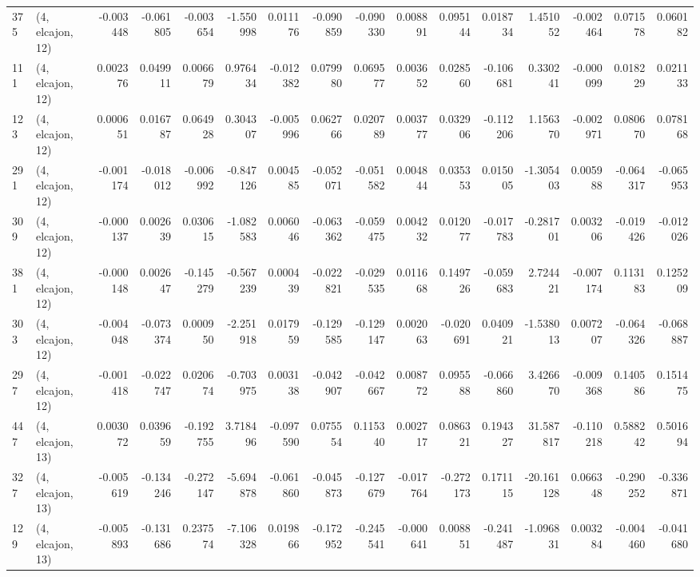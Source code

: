 \begin{tabular}{llrrrrrrrrrrrrrr}
375 &  (4, elcajon, 12) &  -0.003448 & -0.061805 & -0.003654 &   -1.550998 &  0.011176 &  -0.090859 & -0.090330 &  0.008891 &  0.095144 &  0.018734 &    1.451052 & -0.002464 &  0.071578 &  0.060182 \\
111 &  (4, elcajon, 12) &   0.002376 &  0.049911 &  0.006679 &    0.976434 & -0.012382 &   0.079980 &  0.069577 &  0.003652 &  0.028560 & -0.106681 &    0.330241 & -0.000099 &  0.018229 &  0.021133 \\
123 &  (4, elcajon, 12) &   0.000651 &  0.016787 &  0.064928 &    0.304307 & -0.005996 &   0.062766 &  0.020789 &  0.003777 &  0.032906 & -0.112206 &    1.156370 & -0.002971 &  0.080670 &  0.078168 \\
291 &  (4, elcajon, 12) &  -0.001174 & -0.018012 & -0.006992 &   -0.847126 &  0.004585 &  -0.052071 & -0.051582 &  0.004844 &  0.035353 &  0.015005 &   -1.305403 &  0.005988 & -0.064317 & -0.065953 \\
309 &  (4, elcajon, 12) &  -0.000137 &  0.002639 &  0.030615 &   -1.082583 &  0.006046 &  -0.063362 & -0.059475 &  0.004232 &  0.012077 & -0.017783 &   -0.281701 &  0.003206 & -0.019426 & -0.012026 \\
381 &  (4, elcajon, 12) &  -0.000148 &  0.002647 & -0.145279 &   -0.567239 &  0.000439 &  -0.022821 & -0.029535 &  0.011668 &  0.149726 & -0.059683 &    2.724421 & -0.007174 &  0.113183 &  0.125209 \\
303 &  (4, elcajon, 12) &  -0.004048 & -0.073374 &  0.000950 &   -2.251918 &  0.017959 &  -0.129585 & -0.129147 &  0.002063 & -0.020691 &  0.040921 &   -1.538013 &  0.007207 & -0.064326 & -0.068887 \\
297 &  (4, elcajon, 12) &  -0.001418 & -0.022747 &  0.020674 &   -0.703975 &  0.003138 &  -0.042907 & -0.042667 &  0.008772 &  0.095588 & -0.066860 &    3.426670 & -0.009368 &  0.140586 &  0.151475 \\
447 &  (4, elcajon, 13) &   0.003072 &  0.039659 & -0.192755 &    3.718496 & -0.097590 &   0.075554 &  0.115340 &  0.002717 &  0.086321 &  0.194327 &   31.587817 & -0.110218 &  0.588242 &  0.501694 \\
327 &  (4, elcajon, 13) &  -0.005619 & -0.134246 & -0.272147 &   -5.694878 & -0.061860 &  -0.045873 & -0.127679 & -0.017764 & -0.272173 &  0.171115 &  -20.161128 &  0.066348 & -0.290252 & -0.336871 \\
129 &  (4, elcajon, 13) &  -0.005893 & -0.131686 &  0.237574 &   -7.106328 &  0.019866 &  -0.172952 & -0.245541 & -0.000641 &  0.008851 & -0.241487 &   -1.096831 &  0.003284 & -0.004460 & -0.041680 \\

\end{tabular}
